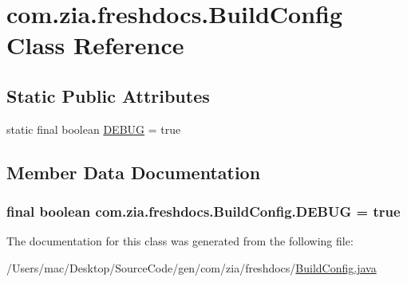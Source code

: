 \hypertarget{classcom_1_1zia_1_1freshdocs_1_1_build_config}{\section{com.\-zia.\-freshdocs.\-Build\-Config Class Reference}
\label{classcom_1_1zia_1_1freshdocs_1_1_build_config}
}
\subsection*{Static Public Attributes}
\begin{DoxyCompactItemize}
\item 
static final boolean \hyperlink{classcom_1_1zia_1_1freshdocs_1_1_build_config_acb487537d7f33fdff3a126b583c60b2b}{D\-E\-B\-U\-G} = true
\end{DoxyCompactItemize}


\subsection{Member Data Documentation}
\hypertarget{classcom_1_1zia_1_1freshdocs_1_1_build_config_acb487537d7f33fdff3a126b583c60b2b}{
\subsubsection[{D\-E\-B\-U\-G}]{\setlength{\rightskip}{0pt plus 5cm}final boolean com.\-zia.\-freshdocs.\-Build\-Config.\-D\-E\-B\-U\-G = true\hspace{0.3cm}{\ttfamily [static]}}}\label{classcom_1_1zia_1_1freshdocs_1_1_build_config_acb487537d7f33fdff3a126b583c60b2b}


The documentation for this class was generated from the following file\-:\begin{DoxyCompactItemize}
\item 
/\-Users/mac/\-Desktop/\-Source\-Code/gen/com/zia/freshdocs/\hyperlink{_build_config_8java}{Build\-Config.\-java}\end{DoxyCompactItemize}
